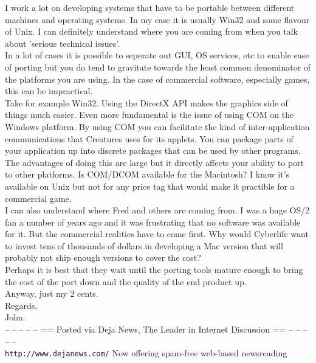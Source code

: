 \documentclass[11pt,twoside,a4paper]{article}
\begin{document}
\begin{multicols*}{2}
I work a lot on developing systems that have to be portable between different machines and operating systems. In my case it is usually Win32 and some flavour of Unix. I can definitely understand where you are coming from when you talk about 'serious technical issues'.~\\

In a lot of cases it is possible to seperate out GUI, OS services, etc to enable ease of porting but you do tend to gravitate towards the least common denominator of the platforms you are using. In the case of commercial software, especially games, this can be impractical.~\\

Take for example Win32. Using the DirectX API makes the graphics side of things much easier. Even more fundamental is the issue of using COM on the Windows platform. By using COM you can facilitate the kind of inter-application communications that Creatures uses for its applets. You can package parts of your application up into discrete packages that can be used by other programs. The advantages of doing this are large but it directly affects your ability to port to other platforms. Is COM/DCOM available for the Macintosh? I know it's available on Unix but not for any price tag that would make it practible for a commercial game.~\\

I can also understand where Fred and others are coming from. I was a huge OS/2 fan a number of years ago and it was frustrating that no software was available for it. But the commercial realities have to come first. Why would Cyberlife want to invest tens of thousands of dollars in developing a Mac version that will probably not ship enough versions to cover the cost?~\\
Perhaps it is best that they wait until the porting tools mature enough to bring the cost of the port down and the quality of the end product up.~\\

Anyway, just my 2 cents.~\\

Regards,~\\
John.~\\

-- -- -- -- -- == Posted via Deja News, The Leader in Internet Discussion == -- -- -- -- --~\\ 
\texttt{http://www.dejanews.com/}   Now offering spam-free web-based newsreading~\\


\end{multicols*}
\end{document}
